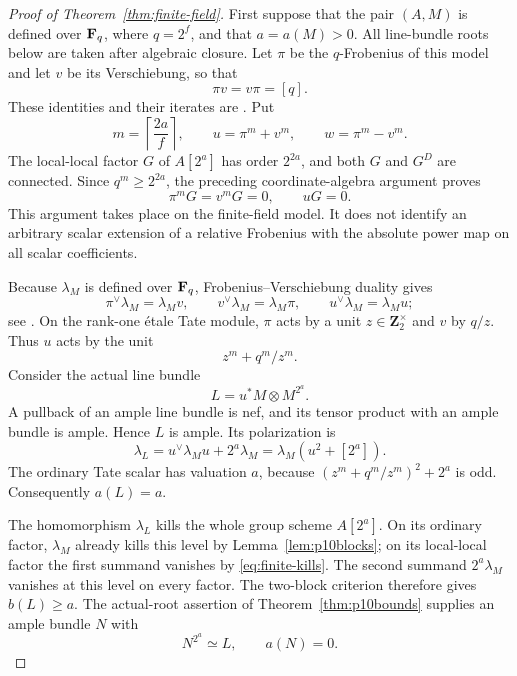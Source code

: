 \begin{proof}[Proof of Theorem~\ref{thm:finite-field}]
First suppose that the pair $(A,M)$ is defined over $\mathbf F_q$, where $q=2^f$, and that $a=a(M)>0$. All line-bundle roots below are taken after algebraic closure. Let $\pi$ be the $q$-Frobenius of this model and let $v$ be its Verschiebung, so that
\[
                     \pi v=v\pi=[q].
\]
These identities and their iterates are \citet[Proposition~5.20 and \S5.21, p.~80]{EGM}. Put
\[
 m=\left\lceil\frac{2a}{f}\right\rceil,
 \qquad u=\pi^m+v^m,\qquad w=\pi^m-v^m.
\]
The local-local factor $G$ of $A[2^a]$ has order $2^{2a}$, and both $G$ and $G^D$ are connected. Since $q^m\ge2^{2a}$, the preceding coordinate-algebra argument proves
\begin{equation}\label{eq:finite-kills}
                        \pi^mG=v^mG=0,
                        \qquad uG=0.
\end{equation}
This argument takes place on the finite-field model. It does not identify an arbitrary scalar extension of a relative Frobenius with the absolute power map on all scalar coefficients.

Because $\lambda_M$ is defined over $\mathbf F_q$, Frobenius--Verschiebung duality gives
\[
 \pi^\vee\lambda_M=\lambda_Mv,
 \qquad v^\vee\lambda_M=\lambda_M\pi,
 \qquad u^\vee\lambda_M=\lambda_Mu;
\]
see \citet[Proposition~7.34 and proof, p.~111]{EGM}. On the rank-one \'etale Tate module, $\pi$ acts by a unit $z\in\mathbf Z_2^\times$ and $v$ by $q/z$. Thus $u$ acts by the unit
\[
                            z^m+q^m/z^m.
\]
Consider the actual line bundle
\begin{equation}\label{eq:finite-L}
                         L=u^*M\otimes M^{2^a}.
\end{equation}
A pullback of an ample line bundle is nef, and its tensor product with an ample bundle is ample. Hence $L$ is ample. Its polarization is
\[
 \lambda_L=u^\vee\lambda_Mu+2^a\lambda_M
           =\lambda_M(u^2+[2^a]).
\]
The ordinary Tate scalar has valuation $a$, because
$(z^m+q^m/z^m)^2+2^a$ is odd. Consequently $a(L)=a$.

The homomorphism $\lambda_L$ kills the whole group scheme $A[2^a]$. On its ordinary factor, $\lambda_M$ already kills this level by Lemma~\ref{lem:p10blocks}; on its local-local factor the first summand vanishes by \eqref{eq:finite-kills}. The second summand $2^a\lambda_M$ vanishes at this level on every factor. The two-block criterion therefore gives $b(L)\ge a$. The actual-root assertion of Theorem~\ref{thm:p10bounds} supplies an ample bundle $N$ with
\begin{equation}\label{eq:finite-root}
                         N^{2^a}\simeq L,
                         \qquad a(N)=0.
\end{equation}


\end{proof}
